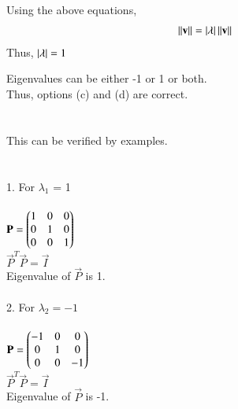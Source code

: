 \documentclass[journal]{IEEEtran}
\begin{document}
Using the above equations,
\begin{align}
\left\lVert\mathbf{v}\right\rVert = \left\vert\lambda\right\vert\left\lVert\mathbf{v}\right\rVert
\end{align}
Thus, $\left\vert\lambda\right\vert = 1$

Eigenvalues can be either -1 or 1 or both. \\

Thus, options (c) and (d) are correct. \\ \\ \\

This can be verified by examples.\\ \\ \\
1. For $\lambda_1$ = 1 \\ \\
$\mathbf{P} = \begin{pmatrix}1 & 0 & 0 \\ 0 & 1 & 0 \\ 0 & 0 & 1\end{pmatrix}$ \\
$\vec{P}^T\vec{P} = \vec{I}$ \\
Eigenvalue of $\vec{P}$ is 1. \\ \\

2. For $\lambda_2 = -1$ \\ \\
$\mathbf{P} = \begin{pmatrix}-1 & 0 & 0 \\ 0 & 1 & 0 \\ 0 & 0 & -1\end{pmatrix}$ \\
$\vec{P}^T\vec{P} = \vec{I}$ \\
Eigenvalue of $\vec{P}$ is -1. \\ \\
\end{document}
